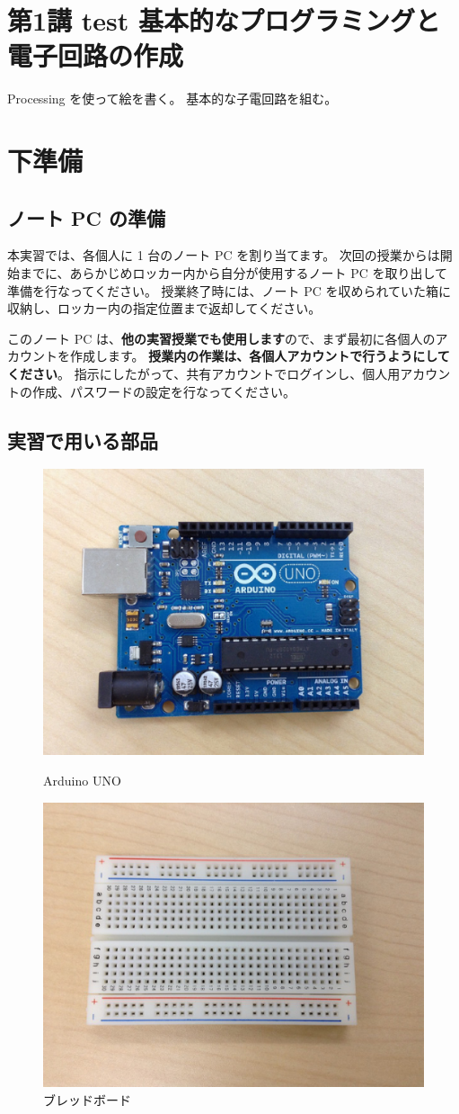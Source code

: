 \documentclass[11pt,a4paper]{jarticle}
\begin{document}
\section*{\LARGE{第1講 test 基本的なプログラミングと電子回路の作成}}
Processing を使って絵を書く。
基本的な子電回路を組む。



\section{下準備}
\subsection*{ノート PC の準備}
本実習では、各個人に 1 台のノート PC を割り当てます。
次回の授業からは開始までに、あらかじめロッカー内から自分が使用するノート PC を取り出して準備を行なってください。
授業終了時には、ノート PC を収められていた箱に収納し、ロッカー内の指定位置まで返却してください。

このノート PC は、\textbf{他の実習授業でも使用します}ので、まず最初に各個人のアカウントを作成します。
\textbf{授業内の作業は、各個人アカウントで行うようにしてください}。
指示にしたがって、共有アカウントでログインし、個人用アカウントの作成、パスワードの設定を行なってください。

\subsection*{実習で用いる部品}
\begin{figure}[h!]
 \begin{minipage}{0.5\columnwidth}
  \centering
  \includegraphics[height=0.4\columnwidth]{img/arduino.eps}
  \caption{Arduino UNO}
 \end{minipage}
 \begin{minipage}{0.5\columnwidth}
  \centering
  \includegraphics[height=0.4\columnwidth]{img/breadboard.eps}
  \caption{ブレッドボード}
 \end{minipage}
\end{figure}
\end{document}

